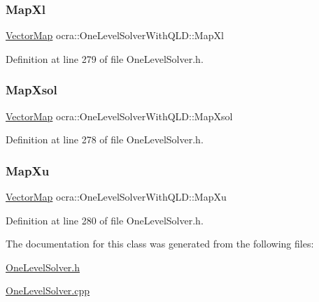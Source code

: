 \subsubsection{\texorpdfstring{Map\+Xl}{MapXl}}
{\footnotesize\ttfamily \hyperlink{group__solver_ga48f83fdb8879c800a49682c6f9c3f2e5}{Vector\+Map} ocra\+::\+One\+Level\+Solver\+With\+Q\+L\+D\+::\+Map\+Xl\hspace{0.3cm}{\ttfamily [protected]}}



Definition at line 279 of file One\+Level\+Solver.\+h.

\hypertarget{classocra_1_1OneLevelSolverWithQLD_a98bcee40691dd4f96240148c11170fa0}{}\label{classocra_1_1OneLevelSolverWithQLD_a98bcee40691dd4f96240148c11170fa0} 
\subsubsection{\texorpdfstring{Map\+Xsol}{MapXsol}}
{\footnotesize\ttfamily \hyperlink{group__solver_ga48f83fdb8879c800a49682c6f9c3f2e5}{Vector\+Map} ocra\+::\+One\+Level\+Solver\+With\+Q\+L\+D\+::\+Map\+Xsol\hspace{0.3cm}{\ttfamily [protected]}}



Definition at line 278 of file One\+Level\+Solver.\+h.

\hypertarget{classocra_1_1OneLevelSolverWithQLD_ae775b8d75c6c825a0f689aafc6316b3b}{}\label{classocra_1_1OneLevelSolverWithQLD_ae775b8d75c6c825a0f689aafc6316b3b} 
\subsubsection{\texorpdfstring{Map\+Xu}{MapXu}}
{\footnotesize\ttfamily \hyperlink{group__solver_ga48f83fdb8879c800a49682c6f9c3f2e5}{Vector\+Map} ocra\+::\+One\+Level\+Solver\+With\+Q\+L\+D\+::\+Map\+Xu\hspace{0.3cm}{\ttfamily [protected]}}



Definition at line 280 of file One\+Level\+Solver.\+h.



The documentation for this class was generated from the following files\+:\begin{DoxyCompactItemize}
\item 
\hyperlink{OneLevelSolver_8h}{One\+Level\+Solver.\+h}\item 
\hyperlink{OneLevelSolver_8cpp}{One\+Level\+Solver.\+cpp}\end{DoxyCompactItemize}
